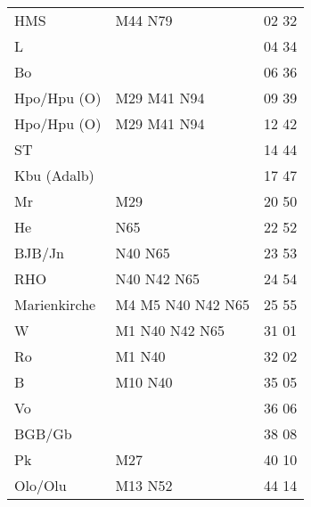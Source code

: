 \begin{tabular}{!{\color{schiefergrau}\vrule width 3pt}*{3}{l!{\color{schiefergrau}\vrule width 3pt}}}
\hline
{}
 \\
\hline
HMS          & \mbus{} M44 \nbus{} N79                                    & 02 32 \\
L            &                                                            & 04 34 \\
Bo           &                                                            & 06 36 \\
Hpo/Hpu (O)  & \nusieben{} \mbus{} M29 M41 \nbus{} N94                    & 09 39 \\
\hline
Hpo/Hpu (O)  & \nusieben{} \mbus{} M29 M41 \nbus{} N94                    & 12 42 \\
ST           &                                                            & 14 44 \\
Kbu (Adalb)  & \nueins{}                                                  & 17 47 \\
Mr           & \mbus{} M29                                                & 20 50 \\
He           & \nbus{} N65                                                & 22 52 \\
BJB/Jn       & \nbus{} N40 N65                                            & 23 53 \\
RHO          & \nuzwei{} \nbus{} N40 N42 N65                              & 24 54 \\
Marienkirche & \nuzwei{} \nufuenf{} \mtram{} M4 M5 \nbus{} N40 N42 N65    & 25 55 \\
W            & \nuzwei{} \nufuenf{} \mtram{} M1 \nbus{} N40 N42 N65       & 31 01 \\
Ro           & \mtram{} M1 \nbus{} N40                                    & 32 02 \\
B            & \mtram{} M10 \nbus{} N40                                   & 35 05 \\
Vo           &                                                            & 36 06 \\
BGB/Gb       &                                                            & 38 08 \\
Pk           & \mbus{} M27                                                & 40 10 \\
Olo/Olu      & \nuneun{} \mtram{} M13 \nbus{} N52                         & 44 14 \\

\end{tabular}
